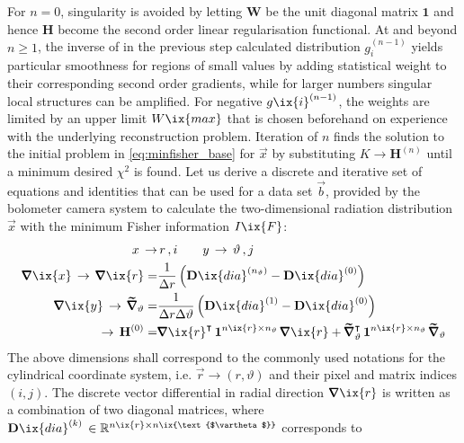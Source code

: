         For $n=0$, singularity is avoided by letting $\mathbf{W}$ be the unit diagonal matrix $\mathbf{1}$ and hence $\mathbf{H}$ become the second order linear regularisation functional. At and beyond $n\ge1$, the inverse of in the previous step calculated distribution $g_{i}^{\left(n-1\right)}$ yields particular smoothness for regions of small values by adding statistical weight to their corresponding second order gradients, while for larger numbers singular local structures can be amplified. For negative $g\ix{i}^{\left(n-1\right)}$, the weights are limited by an upper limit $W\ix{max}$ that is chosen beforehand on experience with the underlying reconstruction problem. Iteration of $n$ finds the solution to the initial problem in \cref{eq:minfisher_base} for $\vec{x}$ by substituting $K\rightarrow\mathbf{H}^{\left(n\right)}$ until a minimum desired $\chi^{2}$ is found. Let us derive a discrete and iterative set of equations and identities that can be used for a data set $\vec{b}$, provided by the bolometer camera system to calculate the two-dimensional radiation distribution $\vec{x}$ with the minimum Fisher information $I\ix{F}$:%
%
        \begin{align}%
            \begin{split}%
                x\,\to&\, r\,,i\qquad y\,\to\,\vartheta\,,j\\%
                \pmb{\nabla}\ix{x}\,\to\,\pmb{\nabla}\ix{r}=&\frac{1}{\Delta r}\left(\mathbf{D}\ix{dia}^{\left(n_{\vartheta}\right)}-\mathbf{D}\ix{dia}^{\left(0\right)}\right)\\%
                \pmb{\nabla}\ix{y}\,\to\,\pmb{\widetilde{\nabla}}_{\vartheta}= &\frac{1}{\Delta r\Delta\vartheta}\left(\mathbf{D}\ix{dia}^{\left(1\right)}-\mathbf{D}\ix{dia}^{\left(0\right)}\right)\\%
                \to\,\mathbf{H}^{\left(0\right)}=&\pmb{\nabla}\ix{r}^{\intercal}\,\mathbf{1}^{n\ix{r}\times n_{\vartheta}}\,\pmb{\nabla}\ix{r}+\pmb{\widetilde{\nabla}}_{\vartheta}^{\intercal}\,\mathbf{1}^{n\ix{r}\times n_{\vartheta}}\,\pmb{\widetilde{\nabla}}_{\vartheta}%
            \end{split}\label{eq:fisher_algo}%
        \end{align}%
%
        The above dimensions shall correspond to the commonly used notations for the cylindrical coordinate system, i.e. $\vec{r}\rightarrow\left(r,\vartheta\right)$ and their pixel and matrix indices $\left(i,j\right)$. The discrete vector differential in radial direction $\pmb{\nabla}\ix{r}$ is written as a combination of two diagonal matrices, where $\mathbf{D}\ix{dia}^{\left(k\right)}\,\in\mathbb{R}^{n\ix{r}\times n\ix{\text{$\vartheta$}}}$ corresponds to%
